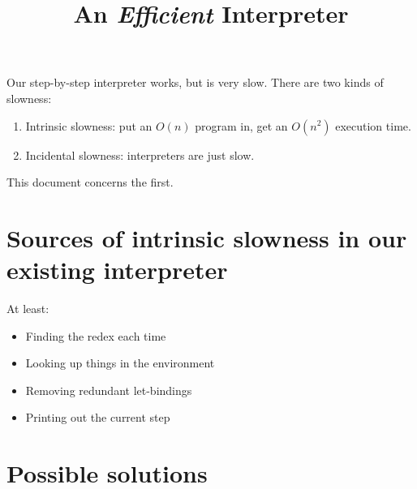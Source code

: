 \documentclass[10pt]{article}
\begin{document}
\title{An \textit{Efficient} Interpreter}
\maketitle

\noindent Our step-by-step interpreter works, but is very slow. There are two kinds of slowness:

\begin{enumerate}
\item Intrinsic slowness: put an $O(n)$ program in, get an $O(n^2)$ execution time.
\item Incidental slowness: interpreters are just slow.
\end{enumerate}

\noindent This document concerns the first.

\section{Sources of intrinsic slowness in our existing interpreter}

\noindent At least:

\begin{itemize}
\item Finding the redex each time
\item Looking up things in the environment
\item Removing redundant let-bindings
\item Printing out the current step
\end{itemize}

\section{Possible solutions}
\end{document}

